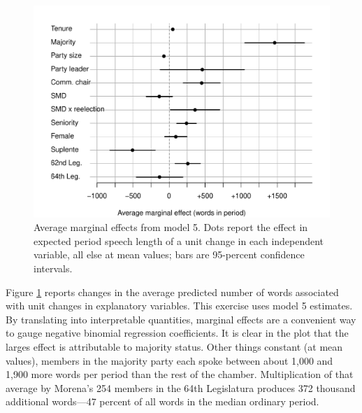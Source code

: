 \documentclass[letter,12pt]{article}
\begin{document}
\begin{figure}
  \centering
    \includegraphics[width=.8\columnwidth]{../plots/avgMgEffects.pdf}
    \caption{Average marginal effects from model 5. Dots report the effect in expected period speech length of a unit change in each independent variable, all else at mean values; bars are 95-percent confidence intervals.}\label{F:avgmgeff}
\end{figure}


Figure \ref{F:avgmgeff} reports changes in the average predicted number of words associated with unit changes in explanatory variables. This exercise uses model 5 estimates. By translating into interpretable quantities, marginal effects are a convenient way to gauge negative binomial regression coefficients. It is clear in the plot that the larges effect is attributable to majority status. Other things constant (at mean values), members in the majority party each spoke between about 1,000 and 1,900 more words per period than the rest of the chamber. Multiplication of that average by Morena's 254 members in the 64th Legislatura produces 372 thousand additional words---47 percent of all words in the median ordinary period.
\end{document}
